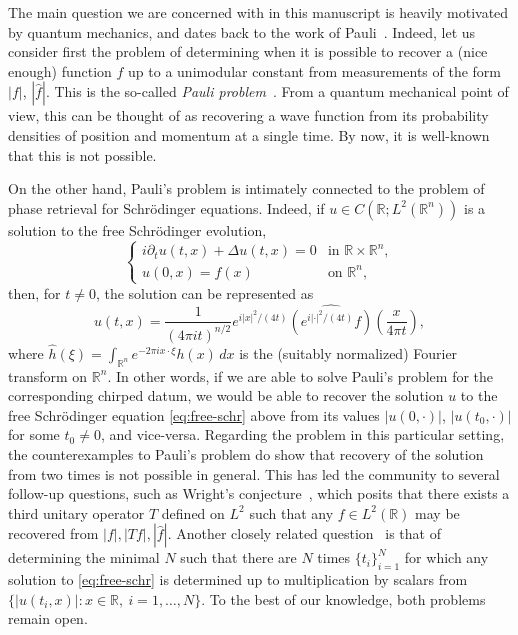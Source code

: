 \documentclass[11pt]{amsart}
\theoremstyle{remark}
\newcommand{\R}{\mathbb R}
\newcommand{\1}{\mathbf 1}
\begin{document}
The main question we are concerned with in this manuscript is heavily motivated by quantum mechanics, and dates back to the work of Pauli~\cite{Pauli}. Indeed, let us consider first the problem of determining when it is possible to recover a (nice enough) function $f$ up to a unimodular constant from measurements of the form $|f|$, $|\widehat f|$. This is the so-called \emph{Pauli problem}~\cite{CorbettHurst,RamosSousa,Vogt}. From a quantum mechanical point of view, this can be thought of as recovering a wave function from its probability densities of position and momentum at a single time. By now, it is well-known that this is not possible. %

On the other hand, Pauli's problem is intimately connected to the problem of phase retrieval for Schr\"odinger equations. Indeed, if $u\in C(\mathbb{R};L^2(\mathbb{R}^n))$ is a solution to the free Schr\"odinger evolution,
\begin{equation}\label{eq:free-schr}
\begin{cases}
i\partial_t u(t,x)+\Delta u(t,x)=0 & \text{in }\R\times\R^n,\\
u(0,x)=f(x) & \text{on }\R^n,
\end{cases}
\end{equation}
then, for $t\ne0$, the solution can be represented as
\[
u(t,x)=\frac{1}{(4\pi i t)^{n/2}}e^{i|x|^2/(4t)}
\widehat{\left(e^{i|\cdot|^2/(4t)}f\right)}
\left(\frac{x}{4\pi t}\right),
\]
where $\widehat h(\xi)=\int_{\R^n}e^{-2\pi i x\cdot\xi}h(x)\,dx$ is the (suitably normalized) Fourier transform on $\mathbb{R}^n$. In other words, if we are able to solve Pauli's problem for the corresponding chirped datum, we would be able to recover the solution $u$ to the free Schr\"odinger equation \eqref{eq:free-schr} above from its values $|u(0,\cdot)|$, $|u(t_0,\cdot)|$ for some $t_0\neq 0$, and vice-versa. Regarding the problem in this particular setting, the counterexamples to Pauli's problem do show that recovery of the solution from two times is not possible in general. This has led the community to several follow-up questions, such as Wright's conjecture~\cite{JamingRathmair}, which posits that there exists a third unitary operator $T$ defined on $L^2$ such that any $f \in L^2(\R)$ may be recovered from $|f|,|Tf|, |\widehat f|$. Another closely related question~\cite{CarmeliHeinosaariSchultzToigo} is that of determining the minimal $N$ such that there are $N$ times $\{t_i\}_{i=1}^N$ for which any solution to \eqref{eq:free-schr} is determined up to multiplication by scalars from $\{|u(t_i,x)|:x\in\R,\ i=1,\dots,N\}$. To the best of our knowledge, both problems remain open.
\end{document}

